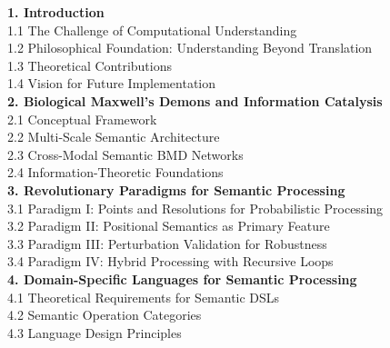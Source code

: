 \documentclass[12pt,a4paper,twoside]{article}
\begin{document}
\noindent
\textbf{1. Introduction}  \\
\hspace{0.5cm} 1.1 The Challenge of Computational Understanding  \\
\hspace{0.5cm} 1.2 Philosophical Foundation: Understanding Beyond Translation  \\
\hspace{0.5cm} 1.3 Theoretical Contributions  \\
\hspace{0.5cm} 1.4 Vision for Future Implementation  \\

\noindent
\textbf{2. Biological Maxwell's Demons and Information Catalysis}  \\
\hspace{0.5cm} 2.1 Conceptual Framework  \\
\hspace{0.5cm} 2.2 Multi-Scale Semantic Architecture  \\
\hspace{0.5cm} 2.3 Cross-Modal Semantic BMD Networks  \\
\hspace{0.5cm} 2.4 Information-Theoretic Foundations  \\

\noindent
\textbf{3. Revolutionary Paradigms for Semantic Processing}  \\
\hspace{0.5cm} 3.1 Paradigm I: Points and Resolutions for Probabilistic Processing  \\
\hspace{0.5cm} 3.2 Paradigm II: Positional Semantics as Primary Feature  \\
\hspace{0.5cm} 3.3 Paradigm III: Perturbation Validation for Robustness  \\
\hspace{0.5cm} 3.4 Paradigm IV: Hybrid Processing with Recursive Loops  \\

\noindent
\textbf{4. Domain-Specific Languages for Semantic Processing}  \\
\hspace{0.5cm} 4.1 Theoretical Requirements for Semantic DSLs  \\
\hspace{0.5cm} 4.2 Semantic Operation Categories  \\
\hspace{0.5cm} 4.3 Language Design Principles  \\
\end{document}
